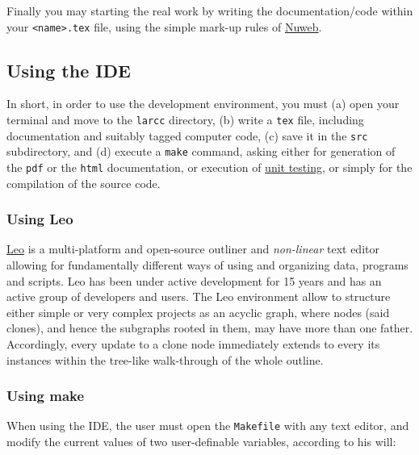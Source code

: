 \documentclass[11pt,oneside]{article}	%
\begin{document}
Finally you may starting the real work by writing the documentation/code within your \texttt{<name>.tex} file, using the simple mark-up rules of \href{run:nuwebdoc.pdf}{Nuweb}.

\subsection{Using the IDE}

In short, in order to use the development environment, you must (a) open your terminal and move to the \texttt{larcc} directory, (b) write a \texttt{tex} file, including documentation and suitably tagged computer code, (c) save it in the \texttt{src} subdirectory, and (d)  execute a \texttt{make} command, asking either for generation of the \texttt{pdf} or the \texttt{html} documentation, or  execution of \href{http://en.wikipedia.org/wiki/Unit_testing}{unit testing}, or simply for the compilation of the source code.


\subsubsection{Using Leo}

\href{http://leoeditor.com}{Leo} is a multi-platform and open-source outliner and \emph{non-linear} text editor allowing for 
fundamentally different ways of using and organizing data, programs and scripts. 
Leo has been under active development for 15 years and has an active group of developers and users.
The Leo environment allow to structure either simple or very complex projects as an acyclic graph, where nodes (said clones), and hence the subgraphs rooted in them, may have more than one father.
Accordingly, every update to a clone node immediately extends to every its instances within the tree-like walk-through of the whole outline.


\subsubsection{Using make}

When using the IDE, the user must open the \texttt{Makefile} with any text editor, and modify the current values of two user-definable variables, according to his will:
\end{document}
